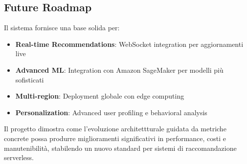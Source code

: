 \documentclass[11pt,a4paper]{article}
\begin{document}
\subsection{Future Roadmap}
Il sistema fornisce una base solida per:
\begin{itemize}
  \item \textbf{Real-time Recommendations}: WebSocket integration per aggiornamenti live
  \item \textbf{Advanced ML}: Integration con Amazon SageMaker per modelli più sofisticati
  \item \textbf{Multi-region}: Deployment globale con edge computing
  \item \textbf{Personalization}: Advanced user profiling e behavioral analysis
\end{itemize}

Il progetto dimostra come l'evoluzione architettturale guidata da metriche concrete possa produrre miglioramenti significativi in performance, costi e manutenibilità, stabilendo un nuovo standard per sistemi di raccomandazione serverless.
\end{document}
